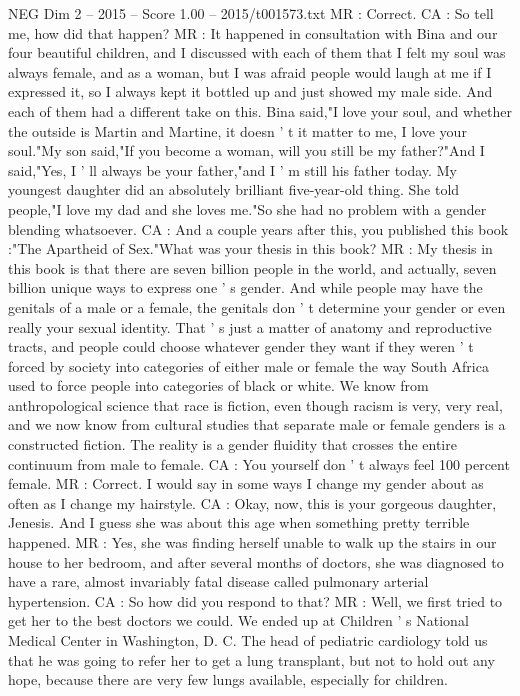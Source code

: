 \begin{textsample}{NEG Dim 2 – 2015 – Score 1.00 – 2015/t001573.txt}
MR : Correct.
CA : So tell me, how did that happen?
MR : It happened in consultation with Bina and our four beautiful children, and I discussed with each of them that I felt my soul was always female, and as a woman, but I was afraid people would laugh at me if I expressed it, so I always kept it bottled up and just showed my male side.
And each of them had a different take on this.
Bina said,"I love your soul, and whether the outside is Martin and Martine, it doesn ' t it matter to me, I love your soul."My son said,"If you become a woman, will you still be my father?"And I said,"Yes, I ' ll always be your father,"and I ' m still his father today.
My youngest daughter did an absolutely brilliant five-year-old thing.
She told people,"I love my dad and she loves me."So she had no problem with a gender blending whatsoever.
CA : And a couple years after this, you published this book :"The Apartheid of Sex."What was your thesis in this book?
MR : My thesis in this book is that there are seven billion people in the world, and actually, seven billion unique ways to express one ' s gender.
And while people may have the genitals of a male or a female, the genitals don ' t determine your gender or even really your sexual identity.
That ' s just a matter of anatomy and reproductive tracts, and people could choose whatever gender they want if they weren ' t forced by society into categories of either male or female the way South Africa used to force people into categories of black or white.
We know from anthropological science that race is fiction, even though racism is very, very real, and we now know from cultural studies that separate male or female genders is a constructed fiction.
The reality is a gender fluidity that crosses the entire continuum from male to female.
CA : You yourself don ' t always feel 100 percent female.
MR : Correct.
I would say in some ways I change my gender about as often as I change my hairstyle.
CA : Okay, now, this is your gorgeous daughter, Jenesis.
And I guess she was about this age when something pretty terrible happened.
MR : Yes, she was finding herself unable to walk up the stairs in our house to her bedroom, and after several months of doctors, she was diagnosed to have a rare, almost invariably fatal disease called pulmonary arterial hypertension.
CA : So how did you respond to that?
MR : Well, we first tried to get her to the best doctors we could.
We ended up at Children ' s National Medical Center in Washington, D.
C.
The head of pediatric cardiology told us that he was going to refer her to get a lung transplant, but not to hold out any hope, because there are very few lungs available, especially for children.

\end{textsample}
